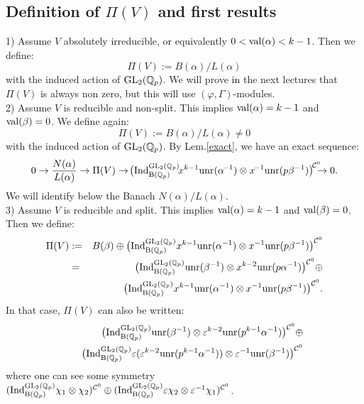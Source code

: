 \documentclass[11pt]{amsart}
\def\Q{{\mathbb Q}_p}
\def\G{{\rm GL}_2(\Q)}
\def\B{{\rm B}(\Q)}
\begin{document}
\subsection{Definition of $\Pi(V)$ and first results}\label{banachsuite} 
 
1) Assume $V$ absolutely irreducible, or equivalently $0<{\rm
   val}(\alpha)<k-1$. Then we define:  
$$\Pi(V):=B(\alpha)/L(\alpha)$$ 
with the induced action of $\G$. We will prove in the next lectures
that $\Pi(V)$ is always non zero, but this will use
$(\varphi,\Gamma)$-modules.\\  
 
2) Assume $V$ is reducible and non-split. This implies ${\rm
   val}(\alpha)=k-1$ and ${\rm val}(\beta)=0$. We define again:  
$$\Pi(V):=B(\alpha)/L(\alpha)\ne 0$$  
with the induced action of $\G$. By Lem.\ref{exact}, we have an exact sequence: 
\begin{eqnarray}\label{exact2} 
0\rightarrow \frac{N(\alpha)}{L(\alpha)}\rightarrow \Pi(V)\rightarrow
\!\big({\rm Ind}_{\B}^{\G}\!x^{k-1}{\rm unr}(\alpha^{\!-1})\otimes
x^{\!-1}{\rm unr}(p\beta^{-1})\big)^{\!{\mathcal
    C}^0}\!\!\!\!\rightarrow 0.  
\end{eqnarray} 
We will identify below the Banach $N(\alpha)/L(\alpha)$.\\ 
 
3) Assume $V$ is reducible and split. This implies ${\rm
   val}(\alpha)=k-1$ and ${\rm val}(\beta)=0$. Then we define:  
\begin{eqnarray*} 
\Pi(V)&:=&B(\beta)\oplus \big({\rm Ind}_{\B}^{\G}x^{k-1}{\rm
  unr}(\alpha^{-1})\otimes x^{-1}{\rm
  unr}(p\beta^{-1})\big)^{{\mathcal C}^0}\\  
&=&\big({\rm Ind}_{\B}^{\G}{\rm unr}(\beta^{-1})\otimes x^{k-2}{\rm
  unr}(p\alpha^{-1})\big)^{{\mathcal C}^0} \oplus \\  
&&\ \ \ \ \ \big({\rm Ind}_{\B}^{\G}x^{k-1}{\rm
  unr}(\alpha^{-1})\otimes x^{-1}{\rm
  unr}(p\beta^{-1})\big)^{{\mathcal C}^0}.  
\end{eqnarray*} 
In that case, $\Pi(V)$ can also be written: 
\begin{eqnarray*} 
\big({\rm Ind}_{\B}^{\G}{\rm unr}(\beta^{-1})\otimes
\varepsilon^{k-2}{\rm unr}(p^{k-1}\alpha^{-1})\big)^{{\mathcal C}^0}
\oplus \\  
\ \ \ \ \ \big({\rm Ind}_{\B}^{\G}\varepsilon(\varepsilon^{k-2}{\rm unr}(p^{k-1}\alpha^{-1}))\otimes \varepsilon^{-1}{\rm unr}(\beta^{-1})\big)^{{\mathcal C}^0} 
\end{eqnarray*} 
where one can see some symmetry $({\rm
  Ind}_{\B}^{\G}\chi_1\otimes\chi_2)^{{\mathcal C}^0} \oplus ({\rm
  Ind}_{\B}^{\G}\varepsilon\chi_2\otimes\varepsilon^{-1}\chi_1)^{{\mathcal C}^0}$.  
 
\end{document}
